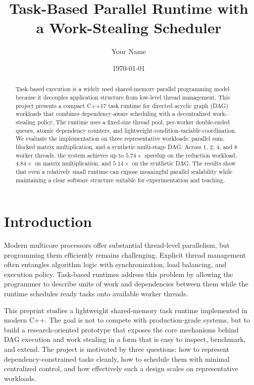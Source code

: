 \documentclass[10pt]{article}
\title{Task-Based Parallel Runtime with a Work-Stealing Scheduler}
\author{Your Name}
\date{\today}
\begin{document}
\maketitle

\begin{abstract}
Task-based execution is a widely used shared-memory parallel programming model because it decouples application structure from low-level thread management. This project presents a compact C++17 task runtime for directed acyclic graph (DAG) workloads that combines dependency-aware scheduling with a decentralized work-stealing policy. The runtime uses a fixed-size thread pool, per-worker double-ended queues, atomic dependency counters, and lightweight condition-variable coordination. We evaluate the implementation on three representative workloads: parallel sum, blocked matrix multiplication, and a synthetic multi-stage DAG. Across 1, 2, 4, and 8 worker threads, the system achieves up to $5.74\times$ speedup on the reduction workload, $4.84\times$ on matrix multiplication, and $5.14\times$ on the synthetic DAG. The results show that even a relatively small runtime can expose meaningful parallel scalability while maintaining a clear software structure suitable for experimentation and teaching.
\end{abstract}

\section{Introduction}
Modern multicore processors offer substantial thread-level parallelism, but programming them efficiently remains challenging. Explicit thread management often entangles algorithm logic with synchronization, load balancing, and execution policy. Task-based runtimes address this problem by allowing the programmer to describe units of work and dependencies between them while the runtime schedules ready tasks onto available worker threads.

This preprint studies a lightweight shared-memory task runtime implemented in modern C++. The goal is not to compete with production-grade systems, but to build a research-oriented prototype that exposes the core mechanisms behind DAG execution and work stealing in a form that is easy to inspect, benchmark, and extend. The project is motivated by three questions: how to represent dependency-constrained tasks cleanly, how to schedule them with minimal centralized control, and how effectively such a design scales on representative workloads.
\end{document}
